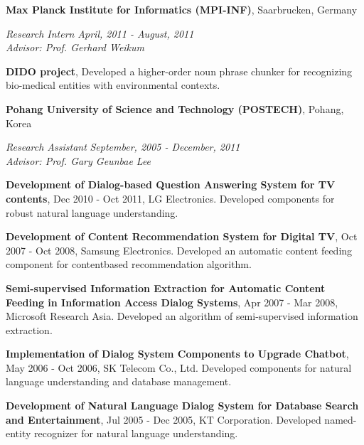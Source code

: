 \documentclass[margin,line]{res}
\newenvironment{list1}{
  \begin{list}{\ding{113}}{%
      \setlength{\itemsep}{0in}
      \setlength{\parsep}{0in} \setlength{\parskip}{0in}
      \setlength{\topsep}{0in} \setlength{\partopsep}{0in}
      \setlength{\leftmargin}{0.17in}}}{\end{list}}
\begin{document}
\begin{resume}
{\bf Max Planck Institute for Informatics (MPI-INF)}, Saarbrucken, Germany\\
\vspace{-.3cm}
\begin{list1}
\item[] {\em Research Intern} \hfill {\em April, 2011 - August, 2011}\\
  {\em Advisor: Prof. Gerhard Weikum} \\
  \vspace{-.3cm}
  \begin{list1}
    \item[] {\bf DIDO project}, Developed a higher-order noun phrase chunker for recognizing bio-medical entities with environmental contexts.
  \end{list1}
\end{list1}

{\bf Pohang University of Science and Technology (POSTECH)}, Pohang, Korea\\
\vspace{-.3cm}
\begin{list1}
\item[] {\em Research Assistant} \hfill {\em September, 2005 - December, 2011}\\
  {\em Advisor: Prof. Gary Geunbae Lee} \\
  \vspace{-.3cm}
  \begin{list1}
    \item[] {\bf Development of Dialog-based Question Answering System for TV contents}, Dec 2010 - Oct 2011, LG Electronics. Developed components for robust natural language understanding.
    \item[] {\bf Development of Content Recommendation System for Digital TV}, Oct 2007 - Oct 2008, Samsung Electronics. Developed an automatic content feeding component for contentbased recommendation algorithm.
    \item[] {\bf Semi-supervised Information Extraction for Automatic Content Feeding in Information Access Dialog Systems}, Apr 2007 - Mar 2008, Microsoft Research Asia. Developed an algorithm of semi-supervised information extraction.
    \item[] {\bf Implementation of Dialog System Components to Upgrade Chatbot}, May 2006 - Oct 2006, SK Telecom Co., Ltd. Developed components for natural language understanding and database management.
    \item[] {\bf Development of Natural Language Dialog System for Database Search and Entertainment}, Jul 2005 - Dec 2005, KT Corporation. Developed named-entity recognizer for natural language understanding.
  \end{list1}
\end{list1}



\end{resume}
\end{document}
